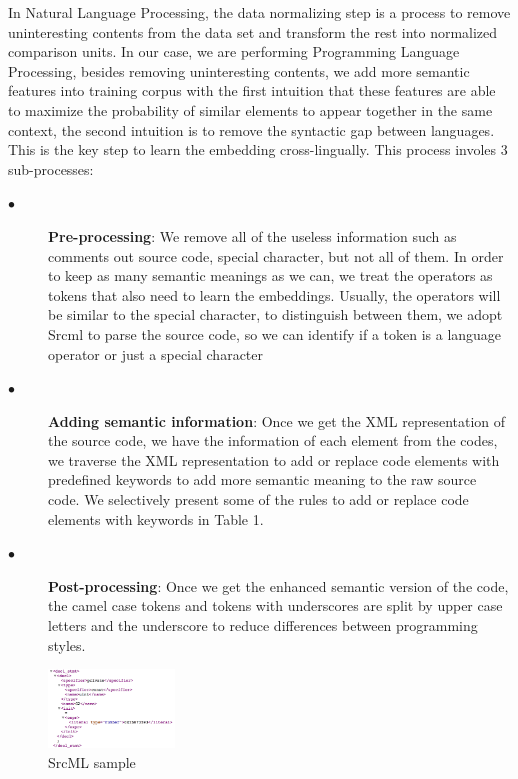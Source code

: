 In Natural Language Processing, the data normalizing step is a process to remove uninteresting contents from the data set and transform the rest into normalized comparison units. In our case, we are performing Programming Language Processing, besides removing uninteresting contents, we add more semantic features into training corpus with the first intuition that these features are able to maximize the probability of similar elements to appear together in the same context, the second intuition is to remove the syntactic gap between languages. This is the key step to learn the embedding cross-lingually. This process involes 3 sub-processes:

\begin{description}
	\item [$\bullet$] \textbf{Pre-processing}: We remove all of the useless information such as comments out source code, special character, but not all of them. In order to keep as many semantic meanings as we can, we treat the operators as tokens that also need to learn the embeddings. Usually, the operators will be similar to the special character, to distinguish between them, we adopt Srcml \cite{collard2011lightweight} to parse the source code, so we can identify if a token is a language operator or just a special character
	\item [$\bullet$] \textbf{Adding semantic information}: Once we get the XML representation of the source code, we have the information of each element from the codes, we traverse the XML representation to add or replace code elements with predefined keywords to add more semantic meaning to the raw source code. We selectively present some of the rules to add or replace code elements with keywords in Table 1.
	\item [$\bullet$] \textbf{Post-processing}: Once we get the enhanced semantic version of the code, the camel case tokens and tokens with underscores are split by upper case letters and the underscore to reduce differences between programming styles.
\end{description}

\begin{figure}[t!]
	
	\includegraphics[width=0.30\textwidth]{srcml_sample}
	\caption{SrcML sample}
	\label{fig:clf}
\end{figure}

